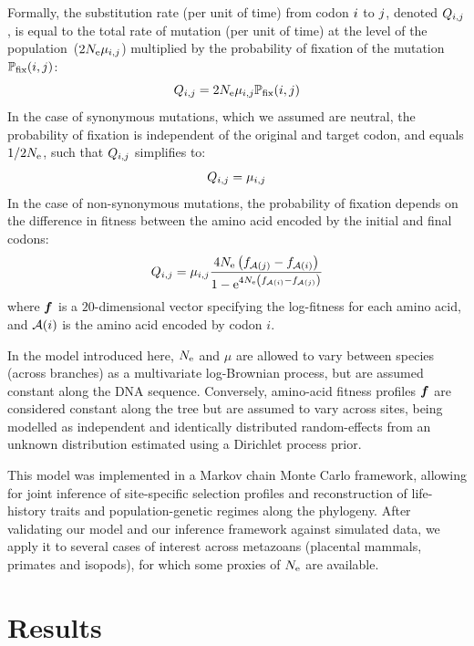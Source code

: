 \documentclass{article}
\begin{document}
Formally, the {substitution} rate (per unit of time) from {codon} ${i}$ to ${j}$, denoted $Q_{{i}, {j}}$, is equal to the total rate of mutation (per unit of time) at the level of the population~($2N_{\text{e}}\mu_{{i}, {j}}$) multiplied by the probability of fixation of the mutation $\mathbb{P}_{\text{fix}}({i}, {j})$:
\begin{equation}
{Q_{{i}, {j}}}
    = 2 N_{\text{e}} \mu_{{i}, {j}} \mathbb{P}_{\text{fix}}({i}, {j})
\end{equation}
In the case of {synonymous} mutations, which we assumed are {neutral}, the probability of fixation is independent of the original and target {codon}, and equals $1/2 N_{\text{e}}$, such that ${Q_{{i}, {j}}}$ simplifies to:
\begin{equation}
    Q_{{i}, {j}} = \mu_{{i}, {j}}
\end{equation}
In the case of {non-synonymous} mutations, the probability of fixation depends on the difference in fitness between the amino acid encoded by the initial and final codons:
\begin{equation}
    \label{eq:mutationSelection}
    {Q_{{i}, {j}}} = \mu_{{i}, {j}} \dfrac{4 N_{\text{e}} \left({f_{\mathcal{A}({j})} - f_{\mathcal{A}({i})}}\right)}{{1 - \text{e}^{4 N_{\text{e}} \left({f_{\mathcal{A}({i})} - f_{\mathcal{A}({j})}}\right)} }}
\end{equation}
where $\bm{f}$ is a $20$-dimensional vector specifying the log-fitness for each amino acid, and $\mathcal{A}({i})$ is the amino acid encoded by {codon} $i$.

In the model introduced here, $N_{\text{e}}$ and $\mu$ are allowed to vary between species (across branches) as a multivariate log-Brownian process, but are assumed constant along the {DNA} sequence.
Conversely, amino-acid fitness profiles $\bm{f}$ are considered constant along the tree but are assumed to vary across sites, being modelled as independent and identically distributed random-effects from an unknown distribution estimated using a {Dirichlet process} {prior}.

This model was implemented in a {Markov chain Monte Carlo} framework, allowing for joint inference of site-specific selection profiles and reconstruction of life-history traits and population-genetic regimes along the phylogeny.
After validating our model and our inference framework against simulated data, we apply it to several cases of interest across metazoans (placental mammals, primates and isopods), for which some proxies of $N_{\text{e}}$ are available.


\section{Results}
\label{sec:Results}
\end{document}
